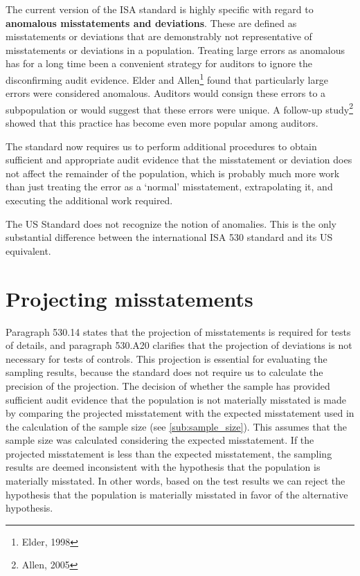 \bigskip
The current version of the ISA standard is highly specific with regard to \textbf{anomalous misstatements and deviations}. These are defined as misstatements or deviations that are demonstrably not representative of misstatements or deviations in a population. Treating large errors as anomalous has for a long time been a convenient strategy for auditors to ignore the disconfirming audit evidence. Elder and Allen\footnote{Elder, 1998} found that particularly large errors were considered anomalous. Auditors would consign these errors to a subpopulation or would suggest that these errors were unique. A follow-up study\footnote{Allen, 2005} showed that this practice has become even more popular among auditors.

The standard now requires us to perform additional procedures to obtain sufficient and appropriate audit evidence that the misstatement or deviation does not affect the remainder of the population, which is probably much more work than just treating the error as a `normal' misstatement, extrapolating it, and executing the additional work required.

The US Standard does not recognize the notion of anomalies. This is the only substantial difference between the international ISA  530 standard and its US equivalent.


\section{Projecting misstatements} %
\label{sec:projecting_misstatements}

Paragraph 530.14 states that the projection of misstatements is required for tests of details, and paragraph 530.A20 clarifies that the projection of deviations is not necessary for tests of controls. This projection is essential for evaluating the sampling results, because the standard does not require us to calculate the precision of the projection. The decision of whether the sample has provided sufficient audit evidence that the population is not materially misstated is made by comparing the projected misstatement with the expected misstatement used in the calculation of the sample size (see \ref{sub:sample_size}). This assumes that the sample size was calculated considering the expected misstatement. If the projected misstatement is less than the expected misstatement, the sampling results are deemed inconsistent with the hypothesis that the population is materially misstated. In other words, based on the test results we can reject the hypothesis that the population is materially misstated in favor of the alternative hypothesis.

